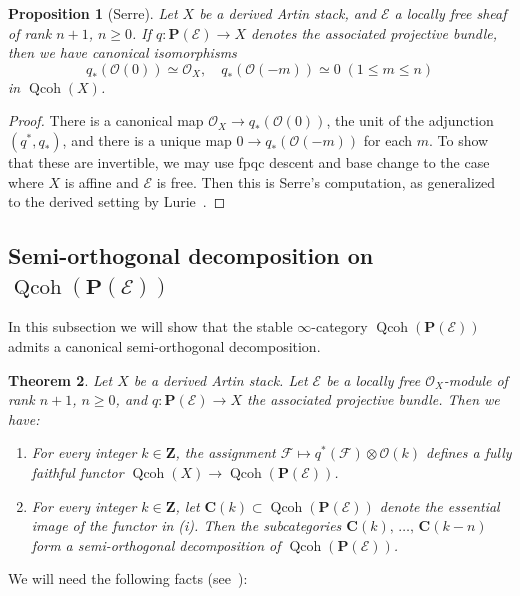\documentclass[11pt]{article}
\newtheorem{theo}{Theorem}[section]
\newtheorem{prop}[theo]{Proposition}
\theoremstyle{definition}
\numberwithin{equation}{section}
\numberwithin{figure}{section}
\numberwithin{table}{section}
\newcommand{\sE}{\ensuremath{\mathcal{E}}\xspace}
\newcommand{\sF}{\ensuremath{\mathcal{F}}\xspace}
\newcommand{\sO}{\ensuremath{\mathcal{O}}\xspace}
\newcommand{\bC}{\ensuremath{\mathbf{C}}\xspace}
\newcommand{\bP}{\ensuremath{\mathbf{P}}\xspace}
\newcommand{\bZ}{\ensuremath{\mathbf{Z}}\xspace}
\renewcommand{\ge}{\geqslant}
\renewcommand{\le}{\leqslant}
\renewcommand{\P}{\bP}
\DeclareMathOperator{\Qcoh}{Qcoh}
\newcommand*{\romanenumi}{\renewcommand*{\theenumi}{\roman{enumi}}}
\begin{document}
\begin{prop}[Serre]\label{prop:Serre}
Let $X$ be a derived Artin stack, and $\sE$ a locally free sheaf of rank $n+1$, $n\ge 0$. If $q : \P(\sE) \to X$ denotes the associated projective bundle, then we have canonical isomorphisms
\[
q_*(\sO(0)) \simeq \sO_X,\quad q_*(\sO(-m)) \simeq 0 \; (1\le m\le n)
\]
in $\Qcoh(X)$.
\end{prop}

\begin{proof}
There is a canonical map $\sO_X \to q_*(\sO(0))$, the unit of the adjunction $(q^*,q_*)$, and there is a unique map $0 \to q_*(\sO(-m))$ for each $m$. To show that these are invertible, we may use fpqc descent and base change to the case where $X$ is affine and $\sE$ is free. Then this is Serre's computation, as generalized to the derived setting by Lurie~\cite[Theorem.~5.4.2.6]{SAG-20180204}.
\end{proof}

\subsection{Semi-orthogonal decomposition on \texorpdfstring{$\Qcoh(\P(\sE))$}{Qcoh(P(E))}}\label{ssec:proj/qcoh}

In this subsection we will show that the stable $\infty$-category $\Qcoh(\P(\sE))$ admits a canonical semi-orthogonal decomposition.

\begin{theo}\label{thm:Qcoh(P(E))}
Let $X$ be a derived Artin stack. Let $\sE$ be a locally free $\sO_X$-module of rank $n+1$, $n\ge 0$, and $q : \P(\sE) \to X$ the associated projective bundle. Then we have:
\begin{enumerate}\romanenumi
\item\label{item:Qcoh(P(E))/fully faithful}
For every integer $k\in\bZ$, the assignment $\sF \mapsto q^*(\sF)\otimes\sO(k)$ defines a fully faithful functor $\Qcoh(X) \to \Qcoh(\P(\sE))$.
\item\label{item:Qcoh(P(E))/SOD}
For every integer $k\in\bZ$, let $\bC(k) \subset \Qcoh(\P(\sE))$ denote the essential image of the functor in (i). Then the subcategories $\bC(k),\,\ldots,\,\bC(k-n)$ form a semi-orthogonal decomposition of $\Qcoh(\P(\sE))$.
\end{enumerate}
\end{theo}

We will need the following facts (see~\cite[Lemmas~7.2.2.2 and 5.6.2.2]{SAG-20180204}):
\end{document}
